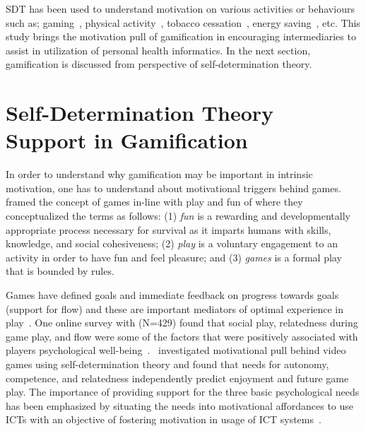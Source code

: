SDT has been used to understand motivation on various activities or behaviours such as; gaming~\citep{ryan2006:motivationalpull}, physical activity~\citep{power2011:obesity}, tobacco cessation~\citep{williams2006:testing}, energy saving~\citep{webb2013:self}, etc. This study brings the motivation pull of gamification in encouraging intermediaries to assist in utilization of personal health informatics. In the next section, gamification is discussed from perspective of self-determination theory.
\section{Self-Determination Theory Support in Gamification}
In order to understand why gamification may be important in intrinsic motivation, one has to understand about motivational triggers behind games.~\cite{knaving2013designing} framed the concept of games in-line with play and fun of where they conceptualized the terms as follows: (1) \emph{fun} is a rewarding and developmentally appropriate process necessary for survival as it imparts humans with skills, knowledge, and social cohesiveness; (2) \emph{play} is a voluntary engagement to an activity in order to have fun and feel pleasure; and (3) \emph{games} is a formal play that is bounded by rules. 

Games have defined goals and immediate feedback on progress towards goals (support for flow) and these are important mediators of optimal experience in play~\citep{knaving2013designing}. One online survey with (N=429) found that social play, relatedness during game play, and flow were some of the factors that were positively associated with players psychological well-being~\citep{vella2013positively}.~\cite{ryan2006:motivationalpull} investigated motivational pull behind video games using self-determination theory and found that needs for autonomy, competence, and relatedness independently predict enjoyment and future game play. The importance of providing support for the three basic psychological needs has been emphasized  by situating the needs into motivational affordances to use ICTs with an objective of fostering motivation in usage of ICT systems~\citep{zhang2008motivational}. 

